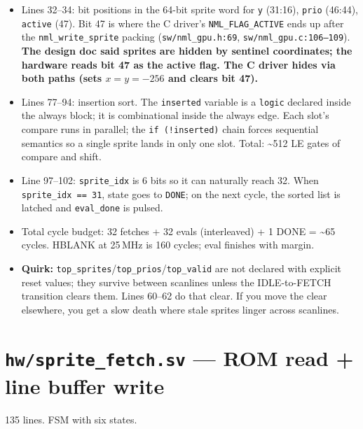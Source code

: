 \documentclass[11pt,letterpaper]{article}
\begin{document}
\begin{itemize}[leftmargin=*]
  \item Lines 32--34: bit positions in the 64-bit sprite word for \texttt{y}
    (31:16), \texttt{prio} (46:44), \texttt{active} (47). Bit 47 is where
    the C driver's \texttt{NML\_FLAG\_ACTIVE} ends up after the
    \texttt{nml\_write\_sprite} packing (\texttt{sw/nml\_gpu.h:69},
    \texttt{sw/nml\_gpu.c:106--109}). \textbf{The design doc said sprites
    are hidden by sentinel coordinates; the hardware reads bit 47 as the
    active flag. The C driver hides via both paths (sets $x = y = -256$
    and clears bit 47).}
  \item Lines 77--94: insertion sort. The \texttt{inserted} variable is a
    \texttt{logic} declared inside the always block; it is combinational
    inside the always edge. Each slot's compare runs in parallel; the
    \texttt{if (!inserted)} chain forces sequential semantics so a single
    sprite lands in only one slot. Total: \textasciitilde 512 LE gates of
    compare and shift.
  \item Line 97--102: \texttt{sprite\_idx} is 6 bits so it can naturally
    reach 32. When \texttt{sprite\_idx == 31}, state goes to \texttt{DONE};
    on the next cycle, the sorted list is latched and \texttt{eval\_done}
    is pulsed.
  \item Total cycle budget: 32 fetches + 32 evals (interleaved) + 1 DONE
    = \textasciitilde 65 cycles. HBLANK at 25\,MHz is 160 cycles; eval
    finishes with margin.
  \item \textbf{Quirk:} \texttt{top\_sprites}/\texttt{top\_prios}/\texttt{top\_valid}
    are not declared with explicit reset values; they survive between
    scanlines unless the IDLE-to-FETCH transition clears them. Lines 60--62
    do that clear. If you move the clear elsewhere, you get a slow death
    where stale sprites linger across scanlines.
\end{itemize}

\section{\texttt{hw/sprite\_fetch.sv} --- ROM read + line buffer write}

135 lines. FSM with six states.
\end{document}
